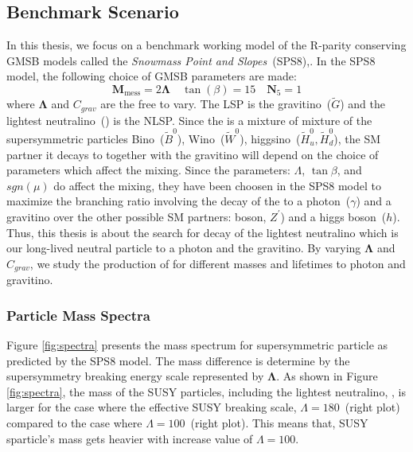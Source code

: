 \subsection{Benchmark Scenario}
In this thesis, we focus on a benchmark working model of the  R-parity conserving GMSB models called the \textit{Snowmass Point and Slopes}~(SPS8),\cite{SPS8}. In the SPS8 model, the following choice of GMSB parameters are made:
\begin{equation}
{\mathbf{M}}_{\mbox{mess}} = 2\mathbf{\Lambda} \quad \tan(\beta)= 15 \quad \mathbf{N}_{5}=1
\end{equation}
where $\mathbf{\Lambda}$ and $C_{grav}$ are the free to vary.
\newline
The LSP is the gravitino~($\tilde{G}$) and the lightest neutralino~(\PSneutralinoOne) is the NLSP.
Since the \PSneutralinoOne is a mixture of  mixture of the supersymmetric particles Bino~($\tilde{B}^{0}$),  Wino~($\tilde{W}^{0}$), higgsino~($\tilde{H}^{0}_{u},\tilde{H}^{0}_{d}$), the SM partner it decays to together with the gravitino  will depend on the choice of parameters which affect the mixing.  Since the parameters: $\Lambda$, $\tan\beta$, and $sgn(\mu)$ do affect the mixing, they have been choosen in the SPS8 model to maximize the branching ratio involving the decay of the \PSneutralinoOne to a photon~($\gamma$) and a gravitino over the other possible SM partners: \PZ boson, $Z^{\prime}$) and a higgs boson~($h$).
\newline
Thus, this thesis is about the search for decay of the lightest neutralino which is our long-lived neutral particle to a photon and the gravitino.
By varying $\mathbf{\Lambda}$ and $C_{grav}$, we study the production of \PSneutralinoOne for different masses and lifetimes to photon and gravitino. 
\subsubsection{Particle Mass Spectra}
Figure \ref{fig:spectra} presents the mass spectrum for supersymmetric particle as predicted by the SPS8 model. The mass difference is determine by the supersymmetry breaking energy scale represented by $\mathbf{\Lambda}$. As shown in Figure \ref{fig:spectra}, the mass of the SUSY particles, including the lightest neutralino, \PSneutralinoOne, is larger for the case where the effective SUSY breaking scale, $\Lambda=180$\TeV~(right plot) compared to the case where $\Lambda = 100$\TeV~(right plot). This means that, SUSY sparticle's mass gets heavier with increase value of  $\Lambda = 100$.

